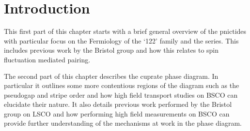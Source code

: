 
\chapter{Introduction}




\begin{chapterabstract}
This first part of this chapter starts with a brief general overview of the pnictides with particular focus on the Fermiology of the `122' family and the \BaFeAsP{} series. This includes previous work by the Bristol group and how this relates to spin fluctuation mediated pairing.

The second part of this chapter describes the cuprate phase diagram. In particular it outlines some more contentious regions of the diagram such as the pseudogap and stripe order and how high field transport studies on \acs{BSCO} can elucidate their nature. It also details previous work performed by the Bristol group on \acs{LSCO} and how performing high field measurements on \acs{BSCO} can provide further understanding of the mechanisms at work in the phase diagram.
\end{chapterabstract}










